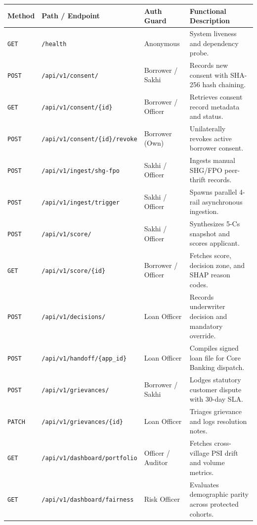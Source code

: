 \begin{table}[H]
\centering
\scriptsize
\renewcommand{\arraystretch}{1.15}
\begin{tabularx}{\textwidth}{l p{5.0cm} p{2.2cm} X}
  \toprule
  \textbf{Method} & \textbf{Path / Endpoint} & \textbf{Auth Guard} & \textbf{Functional Description} \\
  \midrule
  \texttt{GET} & \texttt{/health} & Anonymous & System liveness and dependency probe. \\
  \texttt{POST} & \texttt{/api/v1/consent/} & Borrower / Sakhi & Records new consent with SHA-256 hash chaining. \\
  \texttt{GET} & \texttt{/api/v1/consent/\{id\}} & Borrower / Officer & Retrieves consent record metadata and status. \\
  \texttt{POST} & \texttt{/api/v1/consent/\{id\}/revoke} & Borrower (Own) & Unilaterally revokes active borrower consent. \\
  \addlinespace
  \texttt{POST} & \texttt{/api/v1/ingest/shg-fpo} & Sakhi / Officer & Ingests manual SHG/FPO peer-thrift records. \\
  \texttt{POST} & \texttt{/api/v1/ingest/trigger} & Sakhi / Officer & Spawns parallel 4-rail asynchronous ingestion. \\
  \texttt{POST} & \texttt{/api/v1/score/} & Sakhi / Officer & Synthesizes 5-Cs snapshot and scores applicant. \\
  \texttt{GET} & \texttt{/api/v1/score/\{id\}} & Borrower / Officer & Fetches score, decision zone, and SHAP reason codes. \\
  \addlinespace
  \texttt{POST} & \texttt{/api/v1/decisions/} & Loan Officer & Records underwriter decision and mandatory override. \\
  \texttt{POST} & \texttt{/api/v1/handoff/\{app\_id\}} & Loan Officer & Compiles signed loan file for Core Banking dispatch. \\
  \texttt{POST} & \texttt{/api/v1/grievances/} & Borrower / Sakhi & Lodges statutory customer dispute with 30-day SLA. \\
  \texttt{PATCH} & \texttt{/api/v1/grievances/\{id\}} & Loan Officer & Triages grievance and logs resolution notes. \\
  \addlinespace
  \texttt{GET} & \texttt{/api/v1/dashboard/portfolio} & Officer / Auditor & Fetches cross-village PSI drift and volume metrics. \\
  \texttt{GET} & \texttt{/api/v1/dashboard/fairness} & Risk Officer & Evaluates demographic parity across protected cohorts. \\

\end{tabularx}
\end{table}

